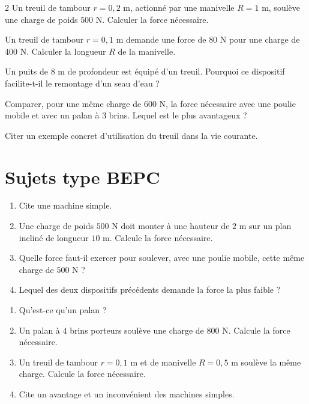 \begin{multicols}{2}
\exo{} Un treuil de tambour $r=0{,}2$ m, actionné par une manivelle $R=1$ m,
soulève une charge de poids $500$ N. Calculer la force nécessaire.

\exo{} Un treuil de tambour $r=0{,}1$ m demande une force de $80$ N pour une
charge de $400$ N. Calculer la longueur $R$ de la manivelle.

\exo{} Un puits de $8$ m de profondeur est équipé d'un treuil. Pourquoi ce
dispositif facilite-t-il le remontage d'un seau d'eau ?

\exo{} Comparer, pour une même charge de $600$ N, la force nécessaire avec une
poulie mobile et avec un palan à $3$ brins. Lequel est le plus avantageux ?

\exo{} Citer un exemple concret d'utilisation du treuil dans la vie courante.

\end{multicols}

\section{Sujets type BEPC}

\begin{enumerate}[label=\arabic*)]
\item Cite une machine simple.
\item Une charge de poids $500$ N doit monter à une hauteur de $2$ m sur un plan incliné
de longueur $10$ m. Calcule la force nécessaire.
\item Quelle force faut-il exercer pour soulever, avec une poulie mobile, cette même
charge de $500$ N ?
\item Lequel des deux dispositifs précédents demande la force la plus faible ?
\end{enumerate}

\begin{enumerate}[label=\arabic*)]
\item Qu'est-ce qu'un palan ?
\item Un palan à $4$ brins porteurs soulève une charge de $800$ N. Calcule la force
nécessaire.
\item Un treuil de tambour $r=0{,}1$ m et de manivelle $R=0{,}5$ m soulève la même charge.
Calcule la force nécessaire.
\item Cite un avantage et un inconvénient des machines simples.
\end{enumerate}

